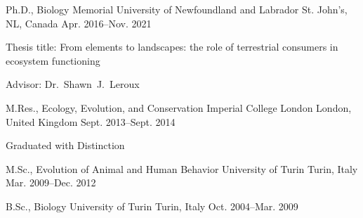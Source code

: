 

\begin{cventries}

  \cventry
    {Ph.D., Biology} %
    {Memorial University of Newfoundland and Labrador} %
    {St. John's, NL, Canada} %
    {Apr. 2016--Nov. 2021} %
    {
      \begin{cvitems} %
        \item {Thesis title: From elements to landscapes: the role of terrestrial consumers in ecosystem functioning}
        \item {Advisor: Dr.~Shawn~J.~Leroux}
      \end{cvitems}
    }

  \cventry
    {M.Res., Ecology, Evolution, and Conservation} %
    {Imperial College London} %
    {London, United Kingdom} %
    {Sept. 2013--Sept. 2014} %
    {
      \begin{cvitems} %
        \item {Graduated with Distinction}
      \end{cvitems}
    }
  
  \cventry
    {M.Sc., Evolution of Animal and Human Behavior} %
    {University of Turin} %
    {Turin, Italy} %
    {Mar. 2009--Dec. 2012} %
    {}
  
  \cventry
    {B.Sc., Biology} %
    {University of Turin} %
    {Turin, Italy} %
    {Oct. 2004--Mar. 2009} %
    {}
\end{cventries}
